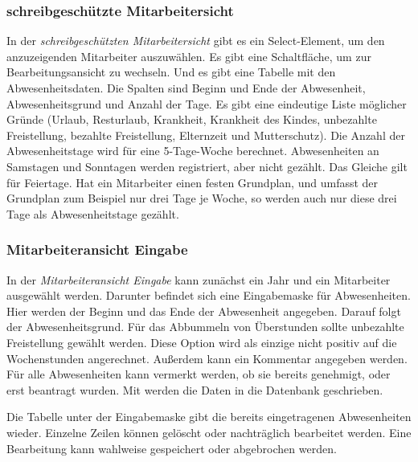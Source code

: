 \subsubsection{schreibgeschützte Mitarbeitersicht}
In der \emph{schreibgeschützten Mitarbeitersicht} gibt es ein
Select-Element, um den anzuzeigenden Mitarbeiter auszuwählen. Es gibt eine
Schaltfläche, um zur Bearbeitungsansicht zu wechseln. Und es gibt eine
Tabelle mit den Abwesenheitsdaten. Die Spalten sind Beginn und Ende der
Abwesenheit, Abwesenheitsgrund und Anzahl der Tage. Es gibt eine eindeutige
Liste möglicher Gründe (Urlaub, Resturlaub, Krankheit, Krankheit des Kindes,
unbezahlte Freistellung, bezahlte Freistellung, Elternzeit und
Mutterschutz). Die Anzahl der Abwesenheitstage wird für eine 5-Tage-Woche
berechnet. Abwesenheiten an Samstagen und Sonntagen werden registriert, aber
nicht gezählt. Das Gleiche gilt für Feiertage.
Hat ein Mitarbeiter einen festen Grundplan, und umfasst der Grundplan zum Beispiel nur drei Tage je Woche, so werden auch nur diese drei Tage als Abwesenheitstage gezählt.

\subsubsection{Mitarbeiteransicht Eingabe}
In der \emph{Mitarbeiteransicht Eingabe} kann zunächst ein Jahr und ein Mitarbeiter ausgewählt werden.
Darunter befindet sich eine Eingabemaske für Abwesenheiten.
Hier werden der Beginn und das Ende der Abwesenheit angegeben.
Darauf folgt der Abwesenheitsgrund. Für das Abbummeln von Überstunden sollte unbezahlte Freistellung gewählt werden. Diese Option wird als einzige nicht positiv auf die Wochenstunden angerechnet.
Außerdem kann ein Kommentar angegeben werden. Für alle Abwesenheiten kann vermerkt werden, ob sie bereits genehmigt, oder erst beantragt wurden. Mit  werden die Daten in die Datenbank geschrieben.

Die Tabelle unter der Eingabemaske gibt die bereits eingetragenen Abwesenheiten wieder.
Einzelne Zeilen können gelöscht  oder nachträglich bearbeitet  werden. Eine Bearbeitung kann wahlweise gespeichert  oder abgebrochen werden.

